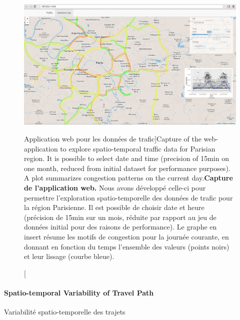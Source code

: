 \begin{figure}
\includegraphics[width=\linewidth]{Figures/Final/8-1-2-fig-transportationequilibrium-fig-1.jpg}
\caption[Web-application for traffic data][Application web pour les données de trafic]{Capture of the web-application to explore spatio-temporal traffic data for Parisian region. It is possible to select date and time (precision of 15min on one month, reduced from initial dataset for performance purposes). A plot summarizes congestion patterns on the current day.\label{fig:transportationequilibrium:fig-1}}{\textbf{Capture de l'application web.} Nous avons développé celle-ci pour permettre l'exploration spatio-temporelle des données de trafic pour la région Parisienne. Il est possible de choisir date et heure (précision de 15min sur un mois, réduite par rapport au jeu de données initial pour des raisons de performance). Le graphe en insert résume les motifs de congestion pour la journée courante, en donnant en fonction du temps l'ensemble des valeurs (points noirs) et leur lissage (courbe bleue).\label{fig:transportationequilibrium:fig-1}}
\end{figure}



\paragraph{Spatio-temporal Variability of Travel Path}{Variabilité spatio-temporelle des trajets}


